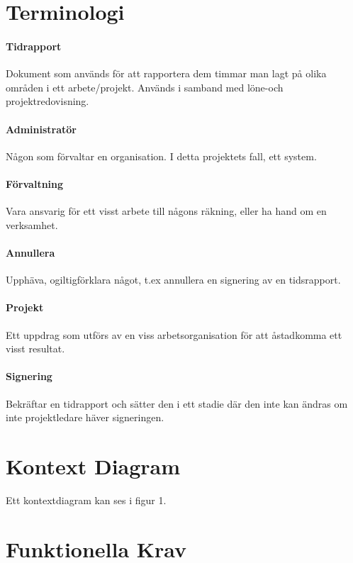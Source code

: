\documentclass[paper=a4, fontsize=11pt,twoside]{article}
\begin{document}
	\section{Terminologi}
	\paragraph{Tidrapport}
	\flushleft
	Dokument som används för att rapportera dem timmar man lagt på olika områden i ett arbete/projekt. Används i samband med löne-och projektredovisning.
	\paragraph{Administratör}
	\flushleft
	Någon som förvaltar en organisation. I detta projektets fall, ett system.
	\paragraph{Förvaltning}
	\flushleft
	Vara ansvarig för ett visst arbete till någons räkning, eller ha hand om en verksamhet.
	\paragraph{Annullera}
	\flushleft
	Upphäva, ogiltigförklara något, t.ex annullera en signering av en tidsrapport.
	\paragraph{Projekt}
	\flushleft
	Ett uppdrag som utförs av en viss arbetsorganisation för att åstadkomma ett visst resultat. 
	\paragraph{Signering}
	\flushleft
	Bekräftar en tidrapport och sätter den i ett stadie där den inte kan ändras om inte projektledare häver signeringen.
	\paragraph{}
	\section{Kontext Diagram}
	Ett kontextdiagram kan ses i figur 1.
	
	\section{Funktionella Krav}
	
\end{document}
